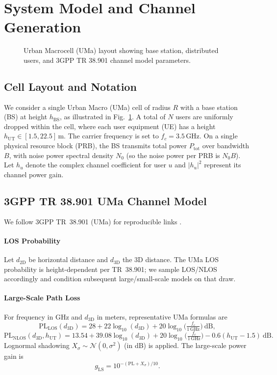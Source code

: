 \section{System Model and Channel Generation}
\label{sec:system-model}


\begin{figure}[t]
  \centering
  \resizebox{0.95\columnwidth}{!}{}
  \caption{Urban Macrocell (UMa) layout showing base station, distributed users, and 3GPP TR 38.901 channel model parameters.}
  \label{fig:3GPP Model}
\end{figure}

\subsection{Cell Layout and Notation}
We consider a single Urban Macro (UMa) cell of radius $R$ with a base station (BS) at height $h_{\mathrm{BS}}$, as illustrated in Fig.~\ref{fig:3GPP Model}. A total of $N$ users are uniformly dropped within the cell, where each user equipment (UE) has a height $h_{\mathrm{UT}}\in[1.5,22.5]$\,m. The carrier frequency is set to $f_c=3.5$\,GHz. On a single physical resource block (PRB), the BS transmits total power $P_{\mathrm{tot}}$ over bandwidth $B$, with noise power spectral density $N_0$ (so the noise power per PRB is $N_0B$). Let $h_u$ denote the complex channel coefficient for user $u$ and $|h_u|^2$ represent its channel power gain.

\subsection{3GPP TR 38.901 UMa Channel Model}
\label{subsec:38901}
We follow 3GPP TR~38.901 (UMa) for reproducible links \cite{etis2024}.

\paragraph*{LOS Probability}
Let $d_{2\mathrm{D}}$ be horizontal distance and $d_{3\mathrm{D}}$ the 3D distance. The UMa LOS probability is height-dependent per TR~38.901; we sample LOS/NLOS accordingly and condition subsequent large/small-scale models on that draw.

\paragraph*{Large-Scale Path Loss}
For frequency in GHz and $d_{3\mathrm{D}}$ in meters, representative UMa formulas are
\[
\mathrm{PL}_{\mathrm{LOS}}(d_{3\mathrm{D}})=28+22\log_{10}(d_{3\mathrm{D}})+20\log_{10}\!\Big(\tfrac{f_c}{1\,\mathrm{GHz}}\Big)\ \mathrm{dB},
\]
\[
\mathrm{PL}_{\mathrm{NLOS}}(d_{3\mathrm{D}},h_{\mathrm{UT}})=13.54+39.08\log_{10}(d_{3\mathrm{D}})
+20\log_{10}\!\Big(\tfrac{f_c}{1\,\mathrm{GHz}}\Big)-0.6(h_{\mathrm{UT}}-1.5)\ \mathrm{dB}.
\]
Lognormal shadowing $X_\sigma\sim\mathcal{N}(0,\sigma^2)$ (in dB) is applied. The large-scale power gain is
\[
g_{\mathrm{LS}}=10^{-(\mathrm{PL}+X_\sigma)/10}.
\]

